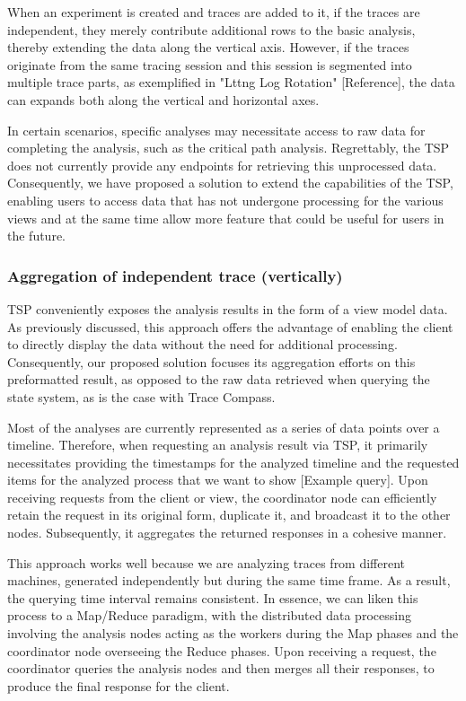 When an experiment is created and traces are added to it, if the traces are independent, they merely contribute additional rows to the basic analysis, thereby extending the data along the vertical axis. However, if the traces originate from the same tracing session and this session is segmented into multiple trace parts, as exemplified in "Lttng Log Rotation" [Reference], the data can expands both along the vertical and horizontal axes.

In certain scenarios, specific analyses may necessitate access to raw data for completing the analysis, such as the critical path analysis. Regrettably, the TSP does not currently provide any endpoints for retrieving this unprocessed data. Consequently, we have proposed a solution to extend the capabilities of the TSP, enabling users to access data that has not undergone processing for the various views and at the same time allow more feature that could be useful for users in the future.

\subsubsection{Aggregation of independent trace (vertically)}

TSP conveniently exposes the analysis results in the form of a view model data. As previously discussed, this approach offers the advantage of enabling the client to directly display the data without the need for additional processing. Consequently, our proposed solution focuses its aggregation efforts on this preformatted result, as opposed to the raw data retrieved when querying the state system, as is the case with Trace Compass.

Most of the analyses are currently represented as a series of data points over a timeline. Therefore, when requesting an analysis result via TSP, it primarily necessitates providing the timestamps for the analyzed timeline and the requested items for the analyzed process that we want to show [Example query]. Upon receiving requests from the client or view, the coordinator node can efficiently retain the request in its original form, duplicate it, and broadcast it to the other nodes. Subsequently, it aggregates the returned responses in a cohesive manner.

This approach works well because we are analyzing traces from different machines, generated independently but during the same time frame. As a result, the querying time interval remains consistent. In essence, we can liken this process to a Map/Reduce paradigm, with the distributed data processing involving the analysis nodes acting as the workers during the Map phases and the coordinator node overseeing the Reduce phases. Upon receiving a request, the coordinator queries the analysis nodes and then merges all their responses, to produce the final response for the client. 

